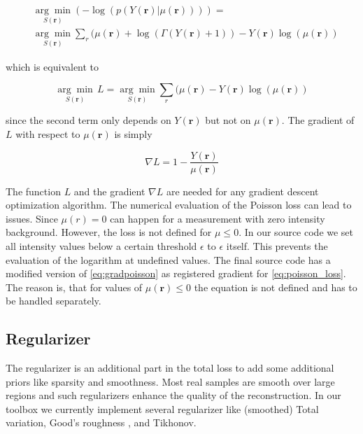 \documentclass{juliacon}
\begin{document}
\begin{align}
&\underset{S(\mathbf r)}{\arg \min} (- \log(p(Y(\mathbf r)|\mu(\mathbf r)))) =\\ &\underset{S(\mathbf r)}{\arg \min} \sum_r (\mu(\mathbf r) + \log(\Gamma(Y(\mathbf r) + 1)) - Y(\mathbf r) \log(\mu(\mathbf r))
\end{align}

which is equivalent to

\begin{equation}
    \underset{S(\mathbf r)}{\arg \min}\, L = \underset{S(\mathbf r)}{\arg \min} \sum_r (\mu(\mathbf r)  - Y(\mathbf r) \log(\mu(\mathbf r))
    \label{eq:poisson_loss}
\end{equation}

since the second term only depends on $Y(\mathbf r)$ but not on $\mu(\mathbf r)$.
The gradient of $L$ with respect to $\mu(\mathbf r)$ is simply

\begin{equation}
    \nabla L = 1 - \frac{Y(\mathbf r)}{\mu(\mathbf r)}
    \label{eq:gradpoisson}
\end{equation}

The function $L$ and the gradient $\nabla L$ are needed for any gradient descent optimization algorithm.
The numerical evaluation of the Poisson loss can lead to issues. Since $\mu(r)=0$ can happen for a measurement with zero intensity background. However, the loss is not defined for $\mu \leq 0$. In our source code we set all intensity values below a certain threshold $\epsilon$ to $\epsilon$ itself. This prevents the evaluation of the logarithm at undefined values.
The final source code has a modified version of \autoref{eq:gradpoisson} as registered gradient for \autoref{eq:poisson_loss}.
The reason is, that for values of $\mu(\mathbf r) \leq 0$ the equation is not defined and has to be handled separately. 

\subsection{Regularizer}
    The regularizer is an additional part in the total loss to add some additional priors like sparsity and smoothness.
    Most real samples are smooth over large regions and such regularizers enhance the quality of the reconstruction.
    In our toolbox we currently implement several regularizer like (smoothed) Total variation, Good's roughness \cite{Verveer:98}, \cite{Good:71} and Tikhonov. 
\end{document}
